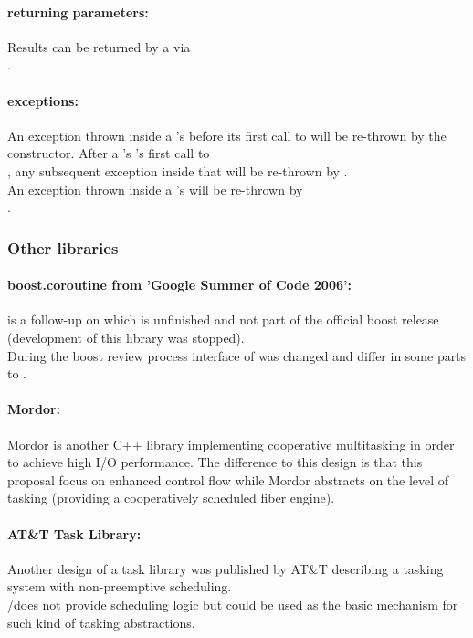 \paragraph*{returning parameters:}
Results can be returned by a \corofunction via\\
\pushcoroop.\\

\paragraph*{exceptions:}
An exception thrown inside a \pullcoro's \corofunction before its first call to
\pushcoroop will be re-thrown by the \pullcoro constructor. After a \pullcoro's
\corofunction's first call to\\
\pushcoroop, any subsequent exception inside that
\corofunction will be re-thrown by \pullcoroop.\\
\newline
An exception thrown inside a \pushcoro's \corofunction will be re-thrown by\\
\pushcoroop.


\subsubsection*{Other libraries}
\paragraph*{boost.coroutine from 'Google Summer of Code 2006':}
\boostcoroutine is a follow-up on \boostcorosum which is unfinished and
not part of the official boost release (development of this library was
stopped).\\
During the boost review process interface of \boostcoroutine was changed and
differ in some parts to \boostcorosum.

\paragraph*{Mordor:}
Mordor\cite{mordor} is another C++ library implementing cooperative multitasking
in order to achieve high I/O performance. The difference to this design is that
this proposal focus on enhanced control flow while Mordor\cite{mordor} abstracts
on the level of tasking (providing a cooperatively scheduled fiber engine).

\paragraph*{AT\&T Task Library:}
Another design of a task library was published by AT\&T\cite{atnt1989}
describing a tasking system with non-preemptive scheduling.\\
\pushcoro/\pullcoro does not provide scheduling logic but could be used as the
basic mechanism for such kind of tasking abstractions.

